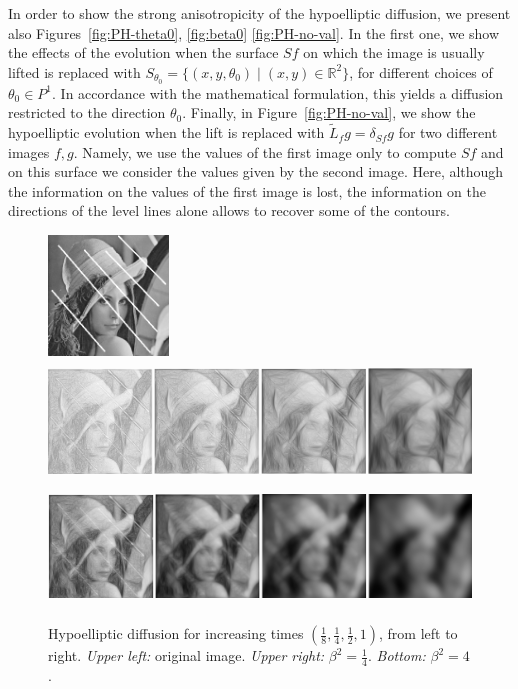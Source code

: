 \documentclass[proc]{edpsmath}
\begin{document}
In order to show the strong anisotropicity of the hypoelliptic diffusion, we present also Figures~\ref{fig:PH-theta0}, \ref{fig:beta0} \ref{fig:PH-no-val}.
In the first one, we show the effects of the evolution when the surface $Sf$ on which the image is usually lifted is replaced with $S_{\theta_0} = \{ (x,y,\theta_0)\mid (x,y)\in\mathbb R^2\}$, for different choices of $\theta_0\in P^1$. In accordance with the mathematical formulation, this yields a diffusion restricted to the direction $\theta_0$.
Finally, in Figure~\ref{fig:PH-no-val}, we show the hypoelliptic evolution when the lift is replaced with $\tilde L_f g = \delta_{Sf}g$ for two different images $f,g$. Namely, we use the values of the first image only to compute $Sf$ and on this surface we consider the values given by the second image. Here, although the information on the values of the first image is lost, the information on the directions of the level lines alone allows to recover some of the contours.

\begin{figure}
  \includegraphics[height=3.2cm]{imgs/lena-diag}\hfill
  \includegraphics[height=3.2cm]{imgs/lena-PH-025}\\ \hfill
  \includegraphics[height=3.16cm]{imgs/lena-PH-4}
  \caption{Hypoelliptic diffusion for increasing times $(\frac18,\frac14,\frac12,1)$, from left to right. \emph{Upper left:} original image. \emph{Upper right: }$\beta^2 = \frac14$. \emph{Bottom:} $\beta^2 = 4$.}
  \label{fig:PH}
\end{figure}
\end{document}
